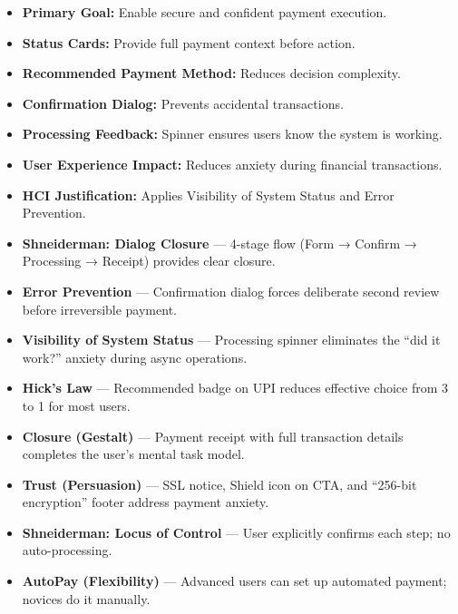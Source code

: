 \documentclass[11pt,a4paper]{article}
\newcommand{\ptag}[1]{\colorbox{tagbg}{\textcolor{tagtxt}{\textbf{\small #1}}}}
\begin{document}
\begin{itemize}[leftmargin=1.5em,itemsep=4pt]

\item \textbf{Primary Goal:}
Enable secure and confident payment execution.

\item \textbf{Status Cards:}
Provide full payment context before action.

\item \textbf{Recommended Payment Method:}
Reduces decision complexity.

\item \textbf{Confirmation Dialog:}
Prevents accidental transactions.

\item \textbf{Processing Feedback:}
Spinner ensures users know the system is working.

\item \textbf{User Experience Impact:}
Reduces anxiety during financial transactions.

\item \textbf{HCI Justification:}
Applies Visibility of System Status and Error Prevention.

\end{itemize}
\begin{hcimap}
\begin{itemize}[leftmargin=1.2em,itemsep=2pt]
  \item \ptag{Shneiderman: Dialog Closure} --- 4-stage flow (Form → Confirm → Processing → Receipt) provides clear closure.
  \item \ptag{Error Prevention} --- Confirmation dialog forces deliberate second review before irreversible payment.
  \item \ptag{Visibility of System Status} --- Processing spinner eliminates the ``did it work?'' anxiety during async operations.
  \item \ptag{Hick's Law} --- Recommended badge on UPI reduces effective choice from 3 to 1 for most users.
  \item \ptag{Closure (Gestalt)} --- Payment receipt with full transaction details completes the user's mental task model.
  \item \ptag{Trust (Persuasion)} --- SSL notice, Shield icon on CTA, and ``256-bit encryption'' footer address payment anxiety.
  \item \ptag{Shneiderman: Locus of Control} --- User explicitly confirms each step; no auto-processing.
  \item \ptag{AutoPay (Flexibility)} --- Advanced users can set up automated payment; novices do it manually.
\end{itemize}
\end{hcimap}
\end{document}
